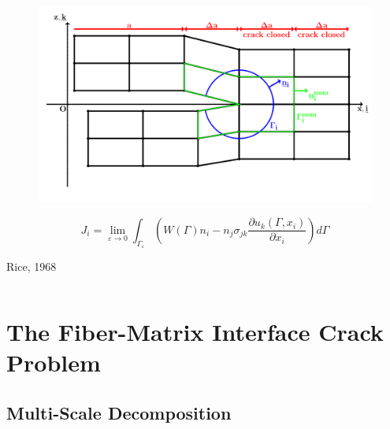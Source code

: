 \documentclass[first,firstsupp,lastsupp,last,hyperref,table]{ETHclass}
\begin{document}
\begin{frame}
\begin{columns}
\begin{column}{0.5\textwidth}
\begin{itemize}[label=]
\begin{figure}
\includegraphics[width=\columnwidth]{J-integral.pdf}
  \label{fig:jintegral}
\end{figure}

\begin{equation*}
J_{i}=\lim_{\varepsilon\to 0}\int_{\Gamma_{\varepsilon}}\left(W\left(\Gamma\right)n_{i}-n_{j}\sigma_{jk}\frac{\partial u_{k}\left(\Gamma,x_{i}\right)}{\partial x_{i}}\right)d\Gamma
\end{equation*}

Rice, 1968
\end{itemize}
\end{column}
\end{columns}
\end{frame}

\section[The Fiber-Matrix Interface Crack Problem]{The Fiber-Matrix Interface Crack Problem}

\subsection{Multi-Scale Decomposition}
\end{document}
